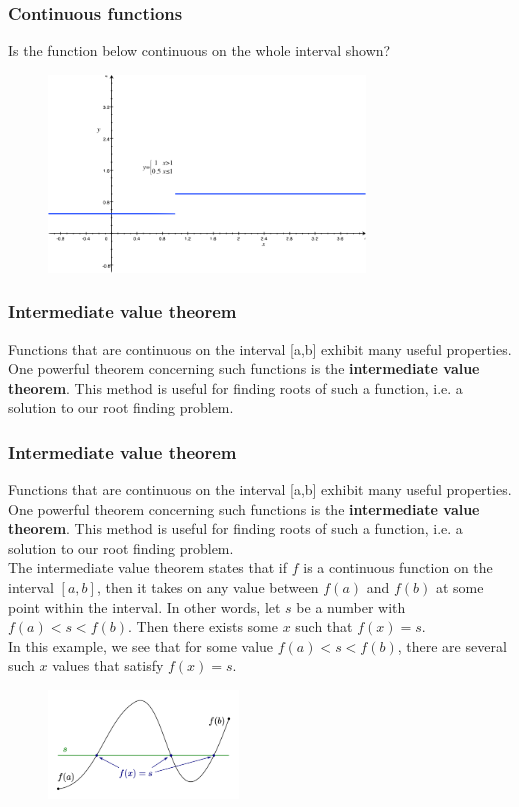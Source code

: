 \documentclass{if-beamer}
\begin{document}
\begin{frame}
\frametitle{Continuous functions}
Is the function below continuous on the whole interval shown?
\begin{figure}
\center
\includegraphics[width=0.75\textwidth]{figures/disc.png}
\end{figure}
\end{frame}

\begin{frame}
\frametitle{Intermediate value theorem}
Functions that are continuous on the interval [a,b] exhibit many useful properties. One powerful theorem concerning such functions is the \textbf{intermediate value theorem}. This method is useful for finding roots of such a function, i.e. a solution to our root finding problem.\\\vspace{5pt} 

\end{frame}

\begin{frame}
\frametitle{Intermediate value theorem}
Functions that are continuous on the interval [a,b] exhibit many useful properties. One powerful theorem concerning such functions is the \textbf{intermediate value theorem}. This method is useful for finding roots of such a function, i.e. a solution to our root finding problem.\\\vspace{5pt} 
The intermediate value theorem states that if $f$ is a continuous function
on the interval $[a,b]$,  then it takes on any value between
$f(a)$ and $f(b)$ at some point within the interval. In other words,
let $s$ be a number with $f(a) < s < f(b)$. Then there exists some
$x$ such that $f(x) = s$. \\
\vspace{10pt}
In this example, we see that for some value $f(a) < s < f(b)$, there are several such $x$ values that satisfy $f(x) = s$.
\begin{figure}
	\center
	\includegraphics[width=0.45\textwidth]{figures/ivt.png}
\end{figure}
\end{frame}
\end{document}
